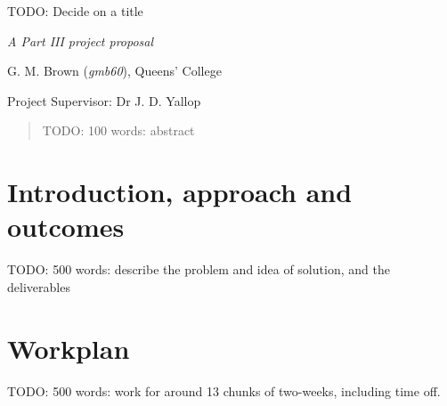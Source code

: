 \documentclass[11pt]{article}
\begin{document}
\centerline{\Large TODO: Decide on a title}
\vspace{2em}
\centerline{\Large \emph{A Part III project proposal}}
\vspace{2em}
\centerline{\large G. M. Brown (\emph{gmb60}), Queens' College}
\vspace{1em}
\centerline{\large Project Supervisor: Dr J. D. Yallop}
\vspace{1em}

\begin{abstract}
  TODO: 100 words: abstract
\end{abstract}

\section{Introduction, approach and outcomes}

TODO: 500 words: describe the problem and idea of solution, and the deliverables

\section{Workplan}

TODO: 500 words: work for around 13 chunks of two-weeks, including time off.

\newpage
\appendix
\end{document}
